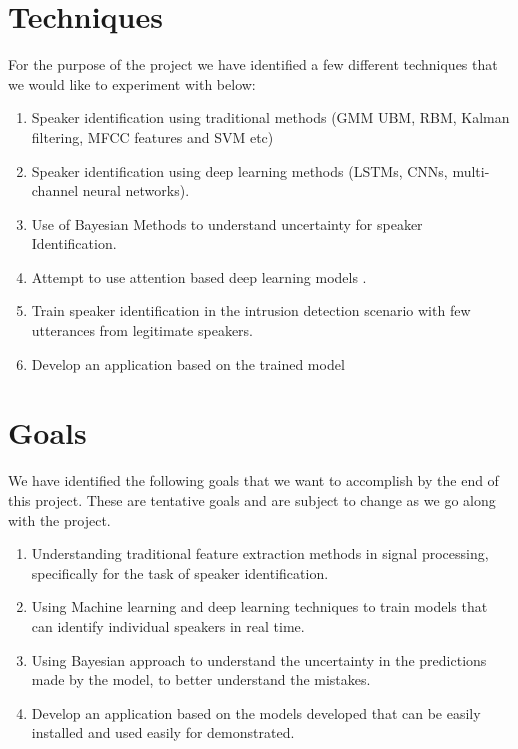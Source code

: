 \documentclass[letterpaper]{article}
\begin{document}
\section{Techniques}
For the purpose of the project we have identified a few different techniques that we would like to experiment with below:
\begin{enumerate}
	\item Speaker identification using traditional methods (GMM UBM, RBM, Kalman filtering, MFCC features and SVM etc)
	
	\item Speaker identification using deep learning methods (LSTMs, CNNs, multi-channel neural networks).
	
	\item Use of Bayesian Methods to understand uncertainty for speaker Identification.
	
	\item Attempt to use attention based deep learning models .
	
	\item Train speaker identification in the intrusion detection scenario with few utterances from legitimate speakers.
	
	\item Develop an application based on the trained model
	
\end{enumerate}
\section{Goals}
We have identified the following goals that we want to accomplish by the end of this project. These are tentative goals and are subject to change as we go along with the project.
\begin{enumerate}
	\item Understanding traditional feature extraction methods in signal processing, specifically for the task of speaker identification.
	
	\item Using Machine learning and deep learning techniques to train models that can identify individual speakers in real time.
	
	\item Using Bayesian approach to understand the uncertainty in the predictions made by the model, to better understand the mistakes.
	
	\item Develop an application based on the models developed that can be easily installed and used easily for demonstrated.
\end{enumerate}
\end{document}
